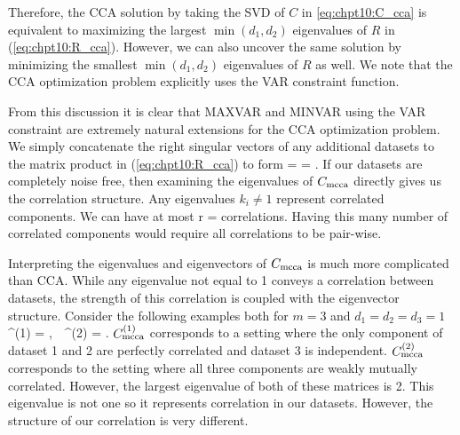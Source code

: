 Therefore, the CCA solution by taking the SVD of $C$ in \ref{eq:chpt10:C_cca} is equivalent to
maximizing the largest $\min(d_1,d_2)$ eigenvalues of $R$ in (\ref{eq:chpt10:R_cca}). However, we
can also uncover the same solution by minimizing the smallest $\min(d_1,d_2)$ eigenvalues
of $R$ as well. We note that the CCA optimization problem explicitly uses the VAR
constraint function. 

From this discussion it is clear that MAXVAR and MINVAR using the VAR constraint are
extremely natural extensions for the CCA optimization problem. We simply concatenate the
right singular vectors of any additional datasets to the matrix product in
(\ref{eq:chpt10:R_cca}) to form 
\beq\label{eq:chpt10:R_mcca}
\Rmcca =
 = .
\eeq
If our datasets are completely noise free, then examining the eigenvalues of $C_{\text{mcca}}$
directly gives us the correlation structure. Any eigenvalues $k_i\neq 1$ represent correlated
components. We can have at most 
\be
r = \left{}\right\rfloor
\ee
correlations. Having this many number of correlated components would require all
correlations to be pair-wise. 

Interpreting the eigenvalues and eigenvectors of $C_{\text{mcca}}$ is much more complicated than
CCA. While any eigenvalue not equal to 1 conveys a correlation between datasets, the
strength of this correlation is coupled with the eigenvector structure. Consider the
following examples both for $m=3$ and $d_1=d_2=d_3=1$
\be
\Rmcca^{(1)} =  ,\,\,\,\, \Rmcca^{(2)} =  .
\ee
$C_{\text{mcca}}^{(1)}$ corresponds to a setting where the only component of dataset 1 and 2 are
perfectly correlated and dataset 3 is independent. $C_{\text{mcca}}^{(2)}$ corresponds to the
setting where all three components are weakly mutually correlated. However, the largest
eigenvalue of both of these matrices is 2. This eigenvalue is not one so it represents
correlation in our datasets. However, the structure of our correlation is very different.

